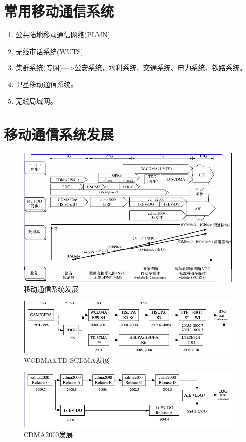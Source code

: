\documentclass[a4paper ]{report}
\begin{document}
	\section{常用移动通信系统}
	\begin{enumerate}
		\item  公共陆地移动通信网络(PLMN)
		\item 无线市话系统(WUTS)
		\item 集群系统(专网)--->公安系统，水利系统、交通系统、电力系统、铁路系统。
		\item 卫星移动通信系统。
		\item 无线局域网。
	\end{enumerate}
	\section{移动通信系统发展}
	\begin{figure}[H]
		\centering
		\includegraphics[scale=0.7]{移动通信系统2G_4G发展.png}
		\caption{移动通信系统发展}
	\end{figure}
	\begin{figure}[H]
		\centering
		\includegraphics[scale=0.7]{WCDMA_TD-SCDMA发展.png}
		\caption{WCDMA\&TD-SCDMA发展}
	\end{figure}
	\begin{figure}
		\centering
		\includegraphics[scale=0.7]{CDMA2000发展.png}
		\caption{CDMA2000发展}
	\end{figure}
\end{document}
